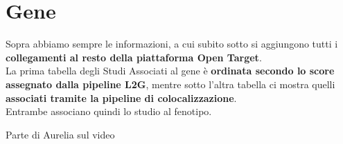 \documentclass{article}
\begin{document}
\section*{Gene}
Sopra abbiamo sempre le informazioni, a cui subito sotto si aggiungono tutti i \textbf{collegamenti al resto della piattaforma Open Target}.\\
La prima tabella degli Studi Associati al gene è \textbf{ordinata secondo lo score assegnato dalla pipeline L2G}, mentre sotto l'altra tabella ci mostra quelli \textbf{associati tramite la pipeline di colocalizzazione}.\\
Entrambe associano quindi lo studio al fenotipo.
\newpage
\begin{center}
    {\color{red} \LARGE Parte di Aurelia sul video}
\end{center}
\newpage
\end{document}
